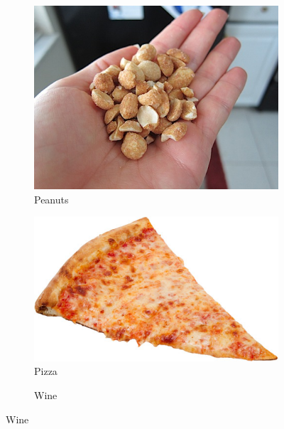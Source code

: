 \documentclass[a4paper,doc,natbib]{apa6}
\begin{document}
\begin{figure}[h!]
\begin{subfigure}[b]{0.32\textwidth}
        \end{subfigure}
        \begin{subfigure}[b]{0.32\textwidth}
            \caption{Peanuts}
            \includegraphics[width=0.95\linewidth]{Images/peanuts.jpg}
        \end{subfigure}
        \begin{subfigure}[b]{0.32\textwidth}
            \caption{Pizza}
            \includegraphics[width=0.95\linewidth]{Images/pizza.jpg}
        \end{subfigure}
        \begin{subfigure}[b]{0.28\textwidth}
            \caption{Wine}

\end{subfigure}
\end{figure}
\end{document}
